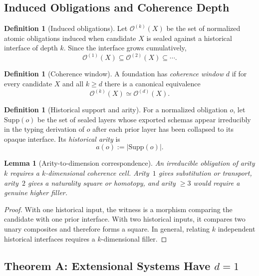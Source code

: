 \documentclass[11pt,a4paper]{article}
\theoremstyle{plain}
\newtheorem{lemma}[theorem]{Lemma}
\theoremstyle{definition}
\newtheorem{definition}[theorem]{Definition}
\theoremstyle{remark}
\newcommand{\Ocal}{\mathcal{O}}
\newcommand{\Supp}{\mathrm{Supp}}
\begin{document}
\subsection{Induced Obligations and Coherence Depth}

\begin{definition}[Induced obligations]
\label{def:obligations}
Let $\Ocal^{(k)}(X)$ be the set of normalized atomic obligations induced when candidate $X$ is sealed against a historical interface of depth $k$.  Since the interface grows cumulatively,
\[
  \Ocal^{(1)}(X)\subseteq \Ocal^{(2)}(X)\subseteq\cdots.
\]
\end{definition}

\begin{definition}[Coherence window]
\label{def:window}
A foundation has \emph{coherence window} $d$ if for every candidate $X$ and all $k\ge d$ there is a canonical equivalence
\[
  \Ocal^{(k)}(X)\simeq \Ocal^{(d)}(X).
\]
\end{definition}

\begin{definition}[Historical support and arity]
\label{def:arity}
For a normalized obligation $o$, let $\Supp(o)$ be the set of sealed layers whose exported schemas appear irreducibly in the typing derivation of $o$ after each prior layer has been collapsed to its opaque interface.  Its \emph{historical arity} is
\[
  a(o):=|\Supp(o)|.
\]
\end{definition}

\begin{lemma}[Arity-to-dimension correspondence]
\label{lem:arity-dimension}
An irreducible obligation of arity $k$ requires a $k$-dimensional coherence cell.  Arity~$1$ gives substitution or transport, arity~$2$ gives a naturality square or homotopy, and arity $\ge 3$ would require a genuine higher filler.
\end{lemma}

\begin{proof}
With one historical input, the witness is a morphism comparing the candidate with one prior interface.  With two historical inputs, it compares two unary composites and therefore forms a square.  In general, relating $k$ independent historical interfaces requires a $k$-dimensional filler.
\end{proof}

\subsection{\texorpdfstring{Theorem A: Extensional Systems Have $d=1$}{Theorem A: Extensional Systems Have d=1}}
\end{document}
